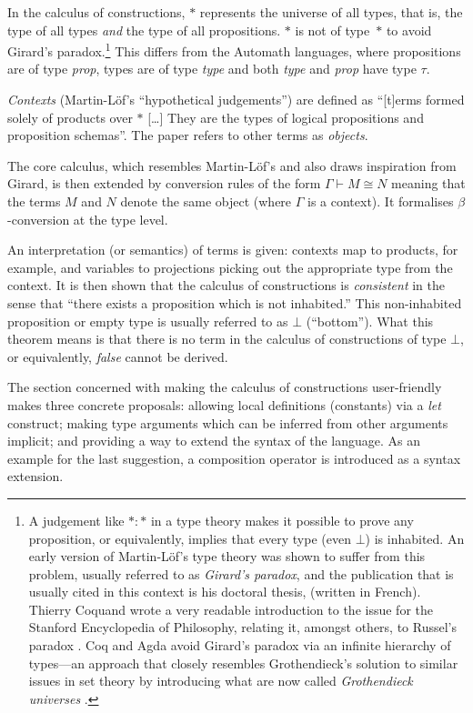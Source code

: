 \documentclass[12pt,toc=bibliography,numbers=noendperiod,
               footnotes=multiple,twoside]{scrartcl}
\begin{document}
In the calculus of constructions, \(*\) represents the universe of all types, that is, the type of all types \emph{and} the type of all propositions. \(*\) is not of type~\(*\) to avoid Girard's paradox.\footnote{A judgement like \(* : *\) in a type theory makes it possible to prove any proposition, or equivalently, implies that every type (even \(\bot\)) is inhabited. An early version of Martin-Löf's type theory was shown to suffer from this problem, usually referred to as \emph{Girard's paradox}, and the publication that is usually cited in this context is his doctoral thesis, \textcite{girard_interpretation_1972} (written in French). Thierry Coquand wrote a very readable introduction to the issue for the Stanford Encyclopedia of Philosophy, relating it, amongst others, to Russel's paradox \autocite{coquand_type_2014}. Coq and Agda avoid Girard's paradox via an infinite hierarchy of types---an approach that closely resembles Grothendieck's solution to similar issues in set theory by introducing what are now called \emph{Grothendieck universes} \autocite{artin_orie_1972}.} This differs from the Automath languages, where propositions are of type \textit{prop}, types are of type \textit{type} and both \textit{type} and \textit{prop} have type \(\tau\).

\emph{Contexts} (Martin-Löf's \enquote{hypothetical judgements}) are defined as \enquote{[t]erms formed solely of products over \(*\) [\dots] They are the types of logical propositions and proposition schemas}. The paper refers to other terms as \emph{objects}.

The core calculus, which resembles Martin-Löf's and also draws inspiration from Girard, is then extended by conversion rules of the form \(\Gamma \vdash M \cong N\) meaning that the terms \(M\) and \(N\) denote the same object (where \(\Gamma\) is a context). It formalises \(\beta\)-conversion at the type level.

An interpretation (or semantics) of terms is given: contexts map to products, for example, and variables to projections picking out the appropriate type from the context. It is then shown that the calculus of constructions is \emph{consistent} in the sense that \enquote{there exists a proposition which is not inhabited.} This non-inhabited proposition or empty type is usually referred to as \(\bot\) (\enquote{bottom}). What this theorem means is that there is no term in the calculus of constructions of type \(\bot\), or equivalently, \emph{false} cannot be derived.

The section concerned with making the calculus of constructions user-friendly makes three concrete proposals: allowing local definitions (constants) via a \textit{let} construct; making type arguments which can be inferred from other arguments implicit; and providing a way to extend the syntax of the language. As an example for the last suggestion, a composition operator is introduced as a syntax extension.
\end{document}
